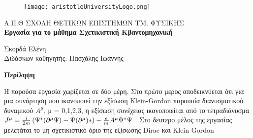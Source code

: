 \documentclass[12pt,oneside,titlepage,a4paper]{article}
\newcommand{\rbr}{
  \ensuremath{\right) }
}
\newcommand{\lbr}{
  \ensuremath{\left( }
}
\renewenvironment{abstract}[1][1.0]
{
	\begin{center}
		{\bf Περίληψη}\\[12pt]
		\begin{minipage}{#1\textwidth}
}
{
		\end{minipage}
	\end{center}
}
\begin{document}

\begin{titlepage}
	\begin{figure}[H]
		\centering
		\texttt{[image: aristotleUniversityLogo.png]}
	\end{figure}
	
	\begin{center}
		\large{{\sc Α.Π.Θ} ΣΧΟΛΗ ΘΕΤΙΚΩΝ ΕΠΙΣΤΗΜΩΝ ΤΜ. ΦΥΣΙΚΗΣ}\\[0.5cm]
		\LARGE\textbf{Εργασία για το μάθημα Σχετικιστική Κβαντομηχανική}\\[1.0cm] 

		\vspace{0.0cm}

		\small{Σκορδά Ελένη}\\[0.2cm]
               
		\small{Διδάσκων καθηγητής: Πασχάλης Ιωάννης }\\[0.2cm]

	\end{center}

	\begin{abstract}
	  Η παρούσα εργασία χωρίζεται σε δύο μέρη. Στο πρώτο μερος αποδεικνύεται ότι για μια συνάρτηση που ικανοποιεί την εξίσωση \textlatin{Klein-Gordon} παρουσία διανυσματικού δυναμικού $A^\mu$, μ = 0,1,2,3, η εξίσωση συνέχειας ικανοποιείται από το τετραδιάνυσμα $J^\mu =\frac{i}{2m} \lbr \Psi^* (\partial^\mu \Psi)-\Psi(\partial^\mu)* \rbr - \frac{e}{m}A^\mu \Psi^* \Psi$ . Στο δευτερο μέλος της εργασίας μελετάται το μη σχετικιστικό όριο της εξίσωσης \textlatin{Dirac} και \textlatin{Klein Gordon}  
          
	\end{abstract}
        
	\vfill

\end{titlepage}

\newpage


\tableofcontents
\newpage



\pagebreak

\pagebreak

\pagebreak
\end{document}

